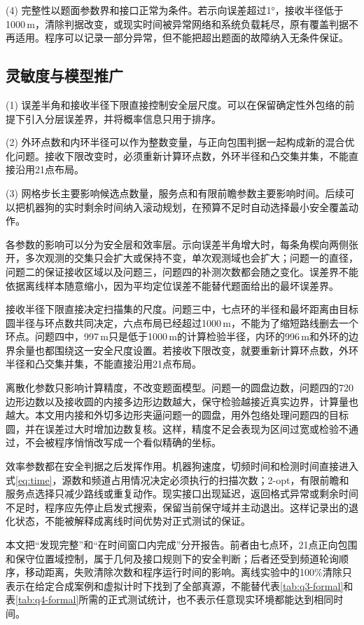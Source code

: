 \documentclass[UTF8,12pt,a4paper]{ctexart}
\newcommand{\enquote}[1]{“#1”}
\numberwithin{equation}{section}
\begin{document}
(4) 完整性以题面参数界和接口正常为条件。若示向误差超过1°，接收半径低于1000\,m，清除判据改变，或现实时间被异常网络和系统负载耗尽，原有覆盖判据不再适用。程序可以记录一部分异常，但不能把超出题面的故障纳入无条件保证。

\subsection{灵敏度与模型推广}

(1) 误差半角和接收半径下限直接控制安全层尺度。可以在保留确定性外包络的前提下引入分层误差界，并将概率信息只用于排序。

(2) 外环点数和内环半径可以作为整数变量，与正向包围判据一起构成新的混合优化问题。接收下限改变时，必须重新计算环点数，外环半径和凸交集并集，不能直接沿用21点布局。

(3) 网格步长主要影响候选点数量，服务点和有限前瞻参数主要影响时间。后续可以把机器狗的实时剩余时间纳入滚动规划，在预算不足时自动选择最小安全覆盖动作。

各参数的影响可以分为安全层和效率层。示向误差半角增大时，每条角楔向两侧张开，多次观测的交集只会扩大或保持不变，单次观测域也会扩大；问题一的直径，问题二的保证接收区域以及问题三，问题四的补测次数都会随之变化。误差界不能依据离线样本随意缩小，因为平均定位误差不能替代题面给出的最坏误差界。

接收半径下限直接决定扫描集的尺度。问题三中，七点环的半径和最坏距离由目标圆半径与环点数共同决定，六点布局已经超过1000\,m，不能为了缩短路线删去一个环点。问题四中，997\,m只是低于1000\,m的计算检验半径，内环的996\,m和外环的边界余量也都围绕这一安全尺度设置。若接收下限改变，就要重新计算环点数，外环半径和凸交集并集，不能直接沿用21点布局。

离散化参数只影响计算精度，不改变题面模型。问题一的圆盘边数，问题四的720边形边数以及接收圆的内接多边形边数越大，保守检验越接近真实边界，计算量也越大。本文用内接和外切多边形夹逼问题一的圆盘，用外包络处理问题四的目标圆，并在误差过大时增加边数复核。这样，精度不足会表现为区间过宽或检验不通过，不会被程序悄悄改写成一个看似精确的坐标。

效率参数都在安全判据之后发挥作用。机器狗速度，切频时间和检测时间直接进入式\eqref{eq:time}，源数和频道占用情况决定必须执行的扫描次数；2-opt，有限前瞻和服务点选择只减少路线或重复动作。现实接口出现延迟，返回格式异常或剩余时间不足时，程序应先停止启发式搜索，保留当前保守域并主动退出。这样记录出的退化状态，不能被解释成离线时间优势对正式测试的保证。

本文把\enquote{发现完整}和\enquote{在时间窗口内完成}分开报告。前者由七点环，21点正向包围和保守位置域控制，属于几何及接口规则下的安全判断；后者还受到频道轮询顺序，移动距离，失败清除次数和程序运行时间的影响。离线实验中的100\%清除只表示在给定合成案例和虚拟计时下找到了全部真源，不能替代表\ref{tab:q3-formal}和表\ref{tab:q4-formal}所需的正式测试统计，也不表示任意现实环境都能达到相同时间。
\end{document}
